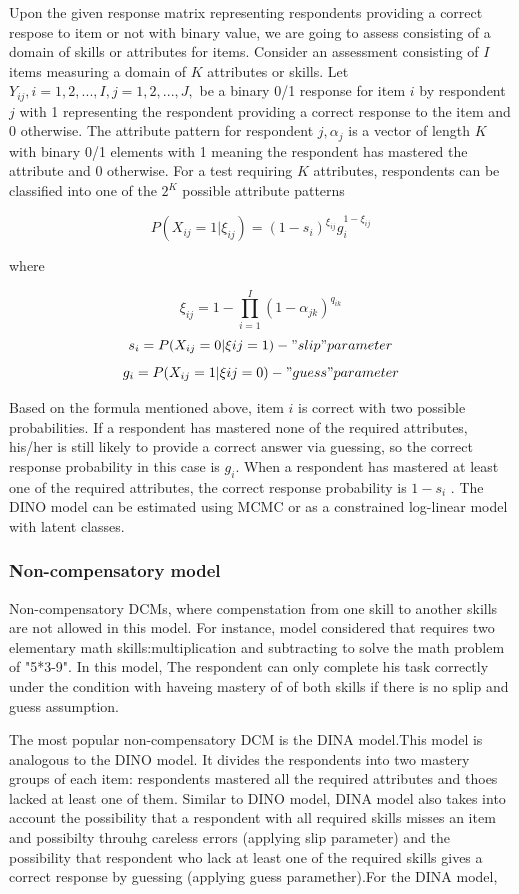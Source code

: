 \documentclass[11pt]{article}
\begin{document}
Upon the given response matrix representing respondents providing a correct respose to item or not with binary value, we are going to assess consisting of a domain of skills or attributes for items. Consider an assessment consisting of $I$ items measuring a domain of $K$ attributes
or skills. Let $Y_{ij} , i=1,2,..., I, j=1,2,...,J,$ be a binary 0/1 response for item $i$ by respondent
$j$ with 1 representing the respondent providing a correct response to the item and 0
otherwise. The attribute pattern for respondent $j, \alpha_j$ is a vector of length $K$ with binary 0/1
elements with 1 meaning the respondent has mastered the attribute and 0 otherwise. For
a test requiring $K$ attributes, respondents can be classified into one of the $2^K$ possible
attribute patterns

$$P (X_{ij}=1|\xi_{ij})=(1-s_i)^{\xi_{ij}}g_i^{1-\xi_{ij}}$$  

where 

$$\xi_{ij}=1 - \prod\limits_{i=1}^I (1-\alpha_{jk})^{q_{ik}}$$
$$ s_i= P(X_{ij}=0|\xi{ij}=1)-"slip" parameter $$
$$ g_i= P(X_{ij}=1|\xi{ij}=0)-"guess" parameter $$
  
Based on the formula mentioned above, item $i$ is correct with two possible probabilities. If a respondent has mastered none of the required attributes, his/her is still
likely to provide a correct answer via guessing, so the correct response probability in this
case is $g_i$. When a respondent has mastered at least one of the required attributes, the
correct response probability is $1−s_i$ . The DINO model can be estimated using
MCMC\cite{templin2006measurement} or as a constrained log-linear model with latent
classes.

\subsubsection{Non-compensatory model}
 Non-compensatory DCMs, where compenstation from one skill to another skills are not allowed in this model. For instance, model considered that requires two elementary math skills:multiplication and subtracting to solve the math problem of "5*3-9". In this model, The respondent can only complete his task correctly under the condition with haveing mastery of of both skills if there is no splip and guess assumption. 
 
 The most popular non-compensatory DCM is the DINA model.This model is analogous to the DINO model. It divides the respondents into two mastery groups of each item: respondents mastered all the required attributes and thoes lacked at least one of them. Similar to DINO model, DINA model also takes into account the possibility that a respondent with all required skills misses an item and possibilty throuhg careless errors (applying slip parameter) and the possibility that respondent who lack at least one of the required skills gives a correct response by guessing (applying guess paramether).For the DINA model, 
 
\end{document}
